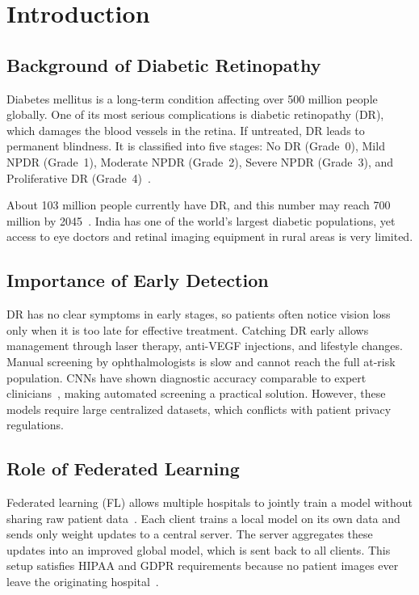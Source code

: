 \documentclass[10pt, conference]{IEEEtran}
\begin{document}
\section{Introduction}

\subsection{Background of Diabetic Retinopathy}

Diabetes mellitus is a long-term condition affecting over 500 million people
globally. One of its most serious complications is diabetic retinopathy (DR),
which damages the blood vessels in the retina. If untreated, DR leads to
permanent blindness. It is classified into five stages: No DR (Grade~0), Mild
NPDR (Grade~1), Moderate NPDR (Grade~2), Severe NPDR (Grade~3), and
Proliferative DR (Grade~4)~\cite{r10}.

About 103 million people currently have DR, and this number may reach
700 million by 2045~\cite{r3}. India has one of the world's largest diabetic
populations, yet access to eye doctors and retinal imaging equipment in rural
areas is very limited.

\subsection{Importance of Early Detection}

DR has no clear symptoms in early stages, so patients often notice vision loss
only when it is too late for effective treatment. Catching DR early allows
management through laser therapy, anti-VEGF injections, and lifestyle changes.
Manual screening by ophthalmologists is slow and cannot reach the full at-risk
population. CNNs have shown diagnostic accuracy comparable to expert
clinicians~\cite{r1}, making automated screening a practical solution. However,
these models require large centralized datasets, which conflicts with patient
privacy regulations.

\subsection{Role of Federated Learning}

Federated learning (FL) allows multiple hospitals to jointly train a model
without sharing raw patient data~\cite{r5}. Each client trains a local model on
its own data and sends only weight updates to a central server. The server
aggregates these updates into an improved global model, which is sent back to all
clients. This setup satisfies HIPAA and GDPR requirements because no patient
images ever leave the originating hospital~\cite{r8}.
\end{document}
